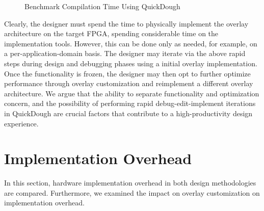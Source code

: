 \begin{figure}
\caption{Benchmark Compilation Time Using QuickDough}
\label{fig:SCGRA-Overlay-Compilation-Time}
\end{figure}


Clearly, the designer must spend the time to physically implement the overlay architecture on the target FPGA, spending considerable time on the implementation tools.
However, this can be done only as needed, for example, on a per-application-domain basis.
The designer may iterate via the above rapid steps during design and debugging phases using a initial overlay implementation.
Once the functionality is frozen, the designer may then opt to further optimize performance through overlay customization and reimplement a different overlay architecture.
We argue that the ability to separate functionality and optimization concern, and the possibility of performing rapid debug-edit-implement iterations in QuickDough are crucial factors that contribute to a high-productivity design experience.


\section{Implementation Overhead} \label{subsec:impl}
In this section, hardware implementation overhead in both design methodologies are compared. Furthermore, we examined the impact on overlay customization on implementation overhead.

